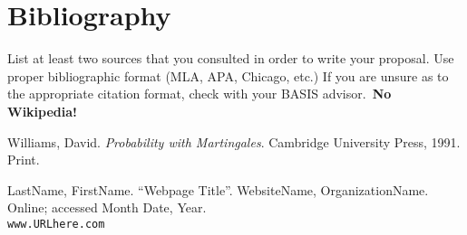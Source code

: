 
\section[Bibliography]{Bibliography}

List at least two sources that you consulted in order to write your proposal. Use proper bibliographic format (MLA, APA, Chicago, etc.) If you are unsure as to the appropriate citation format, check with your BASIS advisor.\ \textbf{No Wikipedia!}




\begin{thebibliography}{1}

    Williams, David.
    \textit{Probability with Martingales}.
    Cambridge University Press, 1991.
    Print.

  LastName, FirstName. ``Webpage Title''.
  WebsiteName, OrganizationName.
  Online; accessed Month Date, Year.\\
  \texttt{www.URLhere.com}

\end{thebibliography}